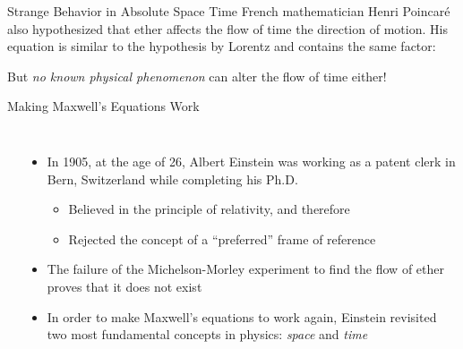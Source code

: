 \documentclass[12pt,compress,aspectratio=169]{beamer}
\newcommand{\bigsqrt}{\ensuremath\sqrt{1-\left(\frac{v}{c}\right)^2}}
\begin{document}
\begin{frame}{Strange Behavior in Absolute Space Time}
  French mathematician Henri Poincar\'{e} also hypothesized that ether affects
  the flow of time the direction of motion. His equation is similar to the
  hypothesis by Lorentz and contains the same factor:

  \eq{-.2in}{
    \boxed{t' =\frac{t}{\bigsqrt}}
  }
  
  But \emph{no known physical phenomenon} can alter the flow of time either!

\end{frame}



\begin{frame}{Making Maxwell's Equations Work}
  \begin{columns}
    \begin{center}
      \vspace{-.15in}{\footnotesize Albert Einstein\\ in 1905\par}
    \end{center}
    
    \begin{itemize}
    \item In 1905, at the age of 26, Albert Einstein was working as a patent
      clerk in Bern, Switzerland while completing his Ph.D.
      \begin{itemize}
      \item Believed in the principle of relativity, and therefore
      \item Rejected the concept of a ``preferred'' frame of reference
      \end{itemize}
    \item The failure of the Michelson-Morley experiment to find the flow of
      ether proves that it does not exist
    \item In order to make Maxwell's equations to work again, Einstein
      revisited two most fundamental concepts in physics: \emph{space} and
      \emph{time}
    \end{itemize}
  \end{columns}
\end{frame}
\end{document}

